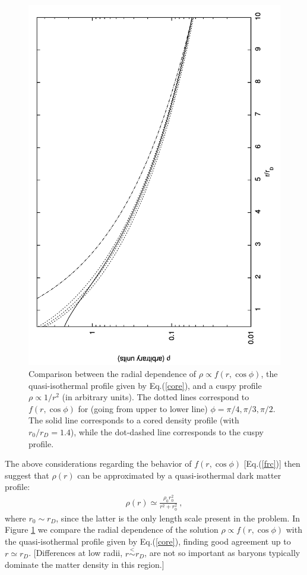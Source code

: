 \documentclass[12pt]{article}
\begin{document}
{{\begin{figure}[htpb]
    \vskip 1cm
    \centering
        \includegraphics[scale=0.5, angle=270]{fig8}
    \caption{Comparison between the radial dependence of $\rho \propto
f(r,\cos \phi)$, 
the quasi-isothermal profile given by Eq.(\ref{core}), and a cuspy
profile $\rho \propto 1/r ^2$ (in arbitrary units). 
The dotted lines correspond to $f(r,\cos \phi)$ for (going from upper to
lower line) $\phi=\pi/4,\pi/3,\pi/2$. The solid line corresponds to a
cored density profile (with $r _0/r _D = 1.4$), while the dot-dashed
line corresponds to the cuspy profile.}
    \label{fig:Comparison core f}
    \vskip 0.8cm
\end{figure}


The above considerations 
regarding the behavior of $f(r,\cos \phi)$ [Eq.(\ref{frc})] then suggest
that $\rho (r)$ can be approximated by a quasi-isothermal dark matter
profile:
%
\begin{eqnarray}
\rho (r) \simeq \frac{\rho _0r _0 ^2}{r ^2 + r _0 ^2} \ ,
\label{core}
\end{eqnarray}
%
where $r _0 \sim r_D$, since the latter is the only length scale present
in the problem. 
In Figure \ref{fig:Comparison core f} we compare the radial dependence
of the 
solution $\rho \propto f(r,\cos \phi)$ with the quasi-isothermal profile
given by Eq.(\ref{core}), finding 
good agreement up to $r \simeq r _D$. 
[Differences at low radii, $r \stackrel{<}{\sim} r_D$, are not so important as baryons typically
dominate the matter density in this region.]


}}
\end{document}
